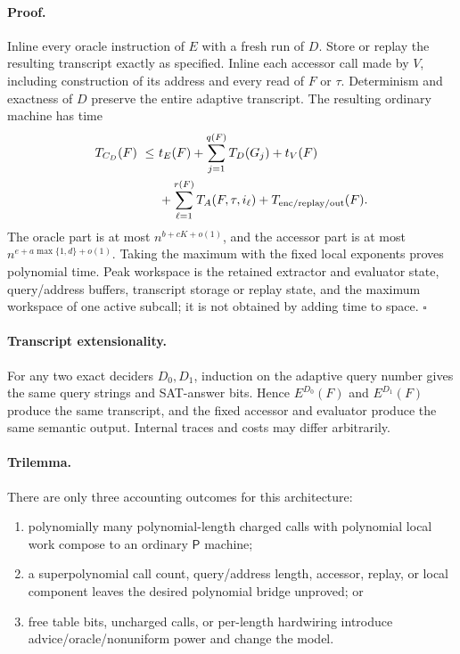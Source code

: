 \documentclass[11pt]{article}
\newcommand{\Pclass}{\mathsf{P}}
\begin{document}
\paragraph{Proof.}
Inline every oracle instruction of \(E\) with a fresh run of \(D\).  Store or
replay the resulting transcript exactly as specified.  Inline each accessor
call made by \(V\), including construction of its address and every read of
\(F\) or \(\tau\).  Determinism and exactness of \(D\) preserve the entire
adaptive transcript.  The resulting ordinary machine has time
\[
\begin{split}
T_{C_D}(F)\ \le\ &t_E(F)+\sum_{j=1}^{q(F)}T_D(G_j)+t_V(F)\\
&+\sum_{\ell=1}^{r(F)}T_A(F,\tau,i_\ell)
+T_{\rm enc/replay/out}(F).
\end{split}
\]
The oracle part is at most \(n^{b+cK+o(1)}\), and the accessor part is at
most \(n^{e+a\max\{1,d\}+o(1)}\).  Taking the maximum with the fixed local
exponents proves polynomial time.  Peak workspace is the retained extractor
and evaluator state, query/address buffers, transcript storage or replay
state, and the maximum workspace of one active subcall; it is not obtained by
adding time to space. \hfill\(\square\)

\paragraph{Transcript extensionality.}
For any two exact deciders \(D_0,D_1\), induction on the adaptive query
number gives the same query strings and SAT-answer bits.  Hence \(E^{D_0}(F)\)
and \(E^{D_1}(F)\) produce the same transcript, and the fixed accessor and
evaluator produce the same semantic output.  Internal traces and costs may
differ arbitrarily.

\paragraph{Trilemma.}
There are only three accounting outcomes for this architecture:
\begin{enumerate}[leftmargin=*]
\item polynomially many polynomial-length charged calls with polynomial
local work compose to an ordinary \(\Pclass\) machine;
\item a superpolynomial call count, query/address length, accessor, replay, or
local component leaves the desired polynomial bridge unproved; or
\item free table bits, uncharged calls, or per-length hardwiring introduce
advice/oracle/nonuniform power and change the model.
\end{enumerate}
\end{document}
